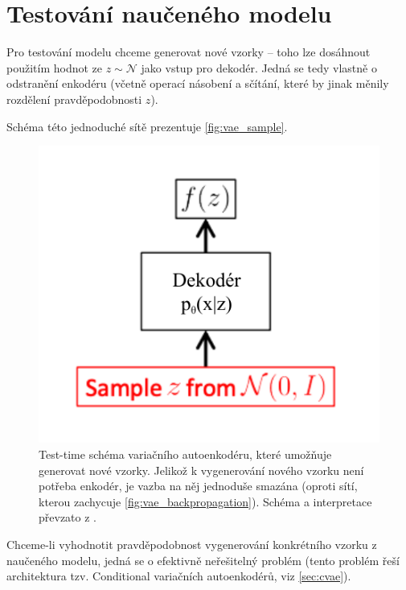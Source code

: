 \newpage
\section{Testování naučeného modelu}
Pro testování modelu chceme generovat nové vzorky – toho lze dosáhnout použitím hodnot ze $z \sim \mathcal{N}$ jako vstup pro dekodér.
Jedná se tedy vlastně o odstranění enkodéru (včetně operací násobení a sčítání, které by jinak měnily rozdělení pravděpodobnosti $z$). \cite{Doersch2021}

Schéma této jednoduché sítě prezentuje \autoref{fig:vae_sample}.

\begin{figure}[H]
    \centering
    \includegraphics{figures/vae_sample.pdf}
    \caption{Test-time schéma variačního autoenkodéru, které umožňuje generovat nové vzorky. Jelikož k vygenerování nového vzorku není potřeba enkodér, je vazba na něj jednoduše smazána (oproti sítí, kterou zachycuje \autoref{fig:vae_backpropagation}). Schéma a interpretace převzato z \cite{Doersch2021}.}
    \label{fig:vae_sample}
\end{figure}

Chceme-li vyhodnotit pravděpodobnost vygenerování konkrétního vzorku z naučeného modelu, jedná se o efektivně neřešitelný problém (tento problém řeší architektura tzv. Conditional variačních autoenkodérů, viz \autoref{sec:cvae}).